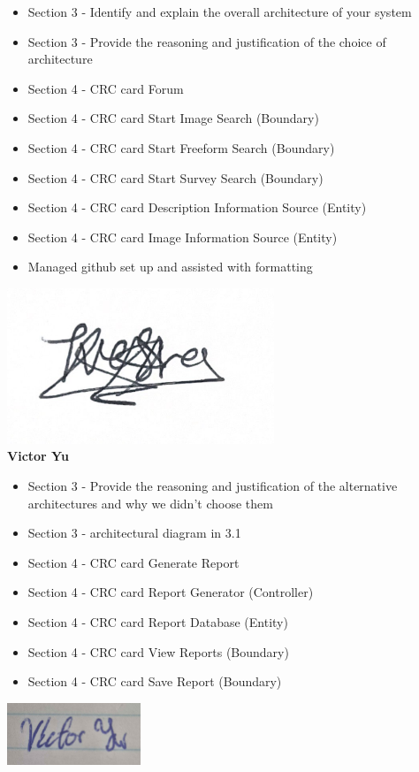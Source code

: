 \documentclass[]{article}
\begin{document}
\begin{itemize}
    \setlength\itemindent{2em}
    \item Section 3 -  Identify and explain the overall architecture of your system  
    \item Section 3 - Provide the reasoning and justification of the choice of architecture 
    \item Section 4 - CRC card Forum 
    \item Section 4 - CRC card Start Image Search (Boundary)
    \item Section 4 - CRC card Start Freeform Search (Boundary)
    \item Section 4 - CRC card Start Survey Search (Boundary) 
    \item Section 4 - CRC card Description Information Source (Entity)
    \item Section 4 - CRC card Image Information Source (Entity)
    \item Managed github set up and assisted with formatting
\end{itemize} 
\includegraphics[width=0.6\textwidth]{Tvesha.png}
\\
\textbf{Victor Yu}
\begin{itemize}
    \setlength\itemindent{2em}
    \item Section 3 -  Provide the reasoning and justification of the alternative architectures and why we didn't choose them 
    \item Section 3 -  architectural diagram in 3.1
    \item Section 4 - CRC card Generate Report
    \item Section 4 - CRC card Report Generator (Controller)
    \item Section 4 - CRC card Report Database (Entity)
    \item Section 4 - CRC card View Reports (Boundary)
    \item Section 4 - CRC card Save Report (Boundary)
\end{itemize}
\includegraphics[width=0.3\textwidth]{Victor.png}
\end{document}
